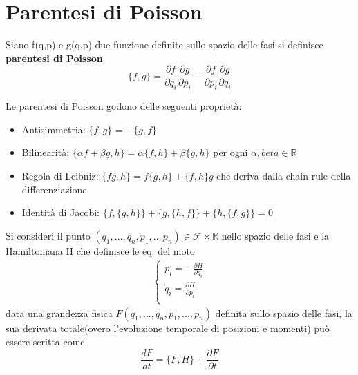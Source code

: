 \section{Parentesi di Poisson}

\begin{definition}
	Siano f(q,p) e g(q,p) due funzione definite sullo spazio delle fasi si definisce \textbf{parentesi di Poisson}
	\begin{equation}
		\{f, g\}=\frac{\partial f}{\partial q_i} \frac{\partial g}{\partial p_i}-\frac{\partial f}{\partial p_i} \frac{\partial g}{\partial q_i}
	\end{equation}
\end{definition}
\noindent Le parentesi di Poisson godono delle seguenti propriet\`{a}:
\begin{itemize}
	\item Antisimmetria: $\{f,g\}$ = $-\{g,f \}$
	\item Bilinearit\`{a}: $\{\alpha f+\beta g, h\}=\alpha\{f, h\}+\beta\{g, h\}$  per ogni $\alpha,beta \in \mathbb{R}$
	\item Regola di Leibniz: $\{f g, h\}=f\{g, h\}+\{f, h\} g$ che deriva dalla chain rule della differenziazione.
	\item Identit\`{a} di Jacobi: $\{f,\{g, h\}\}+\{g,\{h, f\}\}+\{h,\{f, g\}\}=0$
\end{itemize}

\begin{lemma}
	Si consideri il punto $(q_1,...,q_n,p_1,..,p_n)\in \mathcal{F} \times \mathbb{R}$ nello spazio delle fasi e la Hamiltoniana H che definisce le eq. del moto 
\begin{align*}
	\begin{cases}
	\dot{p}_i  =-\frac{\partial H}{\partial q_i} \\
	\dot{q}_i  =\frac{\partial H}{\partial p_i} \\
	\end{cases}	
\end{align*}	
data una grandezza fisica $F(q_1,...,q_n,p_1,...,p_n)$ definita sullo spazio delle fasi, la sua derivata totale(overo l'evoluzione temporale di posizioni e momenti) pu\`{o} essere scritta come 
\begin{equation}
	\dfrac{dF}{dt} = \Big \{F,H \Big\} + \dfrac{\partial F}{\partial t}
\end{equation}
\end{lemma}

